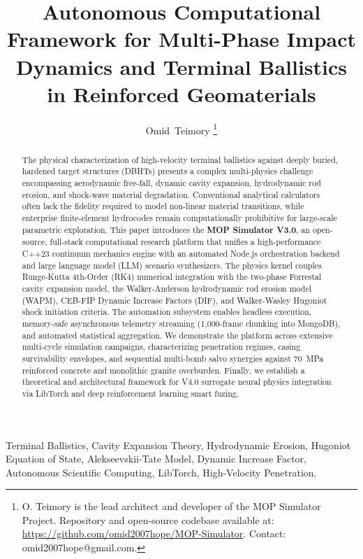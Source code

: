 \documentclass[journal,10pt,twocolumn]{IEEEtran}
\begin{document}
\title{Autonomous Computational Framework for Multi-Phase Impact Dynamics and Terminal Ballistics in Reinforced Geomaterials}

\author{Omid~Teimory%
\thanks{O. Teimory is the lead architect and developer of the MOP Simulator Project. Repository and open-source codebase available at: \url{https://github.com/omid2007hope/MOP-Simulator}. Contact: omid2007hope@gmail.com.}}

\maketitle

\begin{abstract}
The physical characterization of high-velocity terminal ballistics against deeply buried, hardened target structures (DBHTs) presents a complex multi-physics challenge encompassing aerodynamic free-fall, dynamic cavity expansion, hydrodynamic rod erosion, and shock-wave material degradation. Conventional analytical calculators often lack the fidelity required to model non-linear material transitions, while enterprise finite-element hydrocodes remain computationally prohibitive for large-scale parametric exploration. This paper introduces the \textbf{MOP Simulator V3.0}, an open-source, full-stack computational research platform that unifies a high-performance C++23 continuum mechanics engine with an automated Node.js orchestration backend and large language model (LLM) scenario synthesizers. The physics kernel couples Runge-Kutta 4th-Order (RK4) numerical integration with the two-phase Forrestal cavity expansion model, the Walker-Anderson hydrodynamic rod erosion model (WAPM), CEB-FIP Dynamic Increase Factors (DIF), and Walker-Wasley Hugoniot shock initiation criteria. The automation subsystem enables headless execution, memory-safe asynchronous telemetry streaming (1,000-frame chunking into MongoDB), and automated statistical aggregation. We demonstrate the platform across extensive multi-cycle simulation campaigns, characterizing penetration regimes, casing survivability envelopes, and sequential multi-bomb salvo synergies against 70~MPa reinforced concrete and monolithic granite overburden. Finally, we establish a theoretical and architectural framework for V4.0 surrogate neural physics integration via LibTorch and deep reinforcement learning smart fuzing.
\end{abstract}

\begin{IEEEkeywords}
Terminal Ballistics, Cavity Expansion Theory, Hydrodynamic Erosion, Hugoniot Equation of State, Alekseevskii-Tate Model, Dynamic Increase Factor, Autonomous Scientific Computing, LibTorch, High-Velocity Penetration.
\end{IEEEkeywords}
\end{document}

